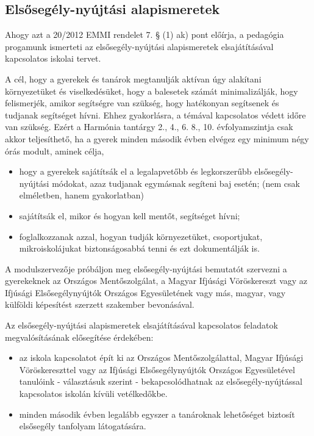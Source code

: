 \subsection{Elsősegély-nyújtási alapismeretek}
\label{sec:elsosegely}
Ahogy azt a 20/2012 EMMI rendelet 7. § (1) ak) pont előírja, a pedagógia progamunk ismerteti az elsősegély-nyújtási alapismeretek elsajátításával kapcsolatos iskolai tervet.

A cél, hogy a gyerekek és tanárok megtanulják aktívan úgy alakítani környezetüket és viselkedésüket, hogy a balesetek számát minimalizálják, hogy felismerjék, amikor segítségre van szükség, hogy hatékonyan segítsenek és tudjanak segítséget hívni. Ehhez gyakorlásra, a témával kapcsolatos védett időre van szükség. Ezért a Harmónia tantárgy 2., 4., 6. 8., 10. évfolyamszintja csak akkor teljesíthető, ha a gyerek minden második évben elvégez egy minimum négy órás modult, aminek célja,
\begin{itemize}
    \item hogy a gyerekek sajátítsák el a legalapvetőbb és legkorszerűbb elsősegély-nyújtási módokat, azaz tudjanak egymásnak segíteni baj esetén; (nem csak elméletben, hanem gyakorlatban)
    \item sajátítsák el, mikor és hogyan kell mentőt, segítséget hívni;
    \item foglalkozzanak azzal, hogyan tudják környezetüket, csoportjukat, mikroiskolájukat biztonságosabbá tenni és ezt dokumentálják is.
\end{itemize}

A modulszervezője próbáljon meg elsősegély-nyújtási bemutatót szervezni a gyerekeknek az Országos Mentőszolgálat, a Magyar Ifjúsági Vöröskereszt vagy az Ifjúsági Elsősegélynyújtók Országos Egyesületének vagy más, magyar, vagy külföldi képesítést szerzett szakember bevonásával.

Az elsősegély-nyújtási alapismeretek elsajátításával kapcsolatos feladatok megvalósításának elősegítése érdekében:
\begin{itemize}
    \item az iskola kapcsolatot épít ki az Országos Mentőszolgálattal, Magyar Ifjúsági Vöröskereszttel vagy az Ifjúsági Elsősegélynyújtók Országos Egyesületével tanulóink - választásuk szerint - bekapcsolódhatnak az elsősegély-nyújtással kapcsolatos iskolán kívüli vetélkedőkbe.
    \item  minden második évben legalább egyszer a tanároknak lehetőséget biztosít elsősegély tanfolyam látogatására.

\end{itemize}
